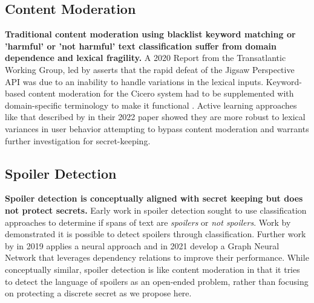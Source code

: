 \documentclass[11pt]{article}
\begin{document}
\subsection{Content Moderation} \label{realted_contentModeration}
\textbf{Traditional content moderation using blacklist keyword matching or 'harmful' or 'not harmful' text classification suffer from domain dependence and lexical fragility.} A 2020 Report from the Transatlantic Working Group, led by \citeauthor{Llanso2020} asserts that the rapid defeat of the Jigsaw Perspective API was due to an inability to handle variations in the lexical inputs. Keyword-based content moderation for the Cicero system had to be supplemented with domain-specific terminology to make it functional \cite{FAIR2022A}. Active learning approaches like that described by \citeauthor{Markov2022} in their 2022 paper showed they are more robust to lexical variances in user behavior attempting to bypass content moderation and warrants further investigation for secret-keeping. 

\subsection{Spoiler Detection} \label{related_spoiler}
\textbf{Spoiler detection is conceptually aligned with secret keeping but does not protect secrets.} Early work in spoiler detection sought to use classification approaches to determine if spans of text are \textit{spoilers} or \textit{not spoilers}. Work by \citeauthor{BoydGraber2013} demonstrated it is possible to detect spoilers through classification. Further work by \citeauthor{Wan2019} in 2019 applies a neural approach and \citeauthor{Chang2021} in 2021 develop a Graph Neural Network that leverages dependency relations to improve their performance. While conceptually similar, spoiler detection is like content moderation in that it tries to detect the language of spoilers as an open-ended problem, rather than focusing on protecting a discrete secret as we propose here. 
\end{document}
